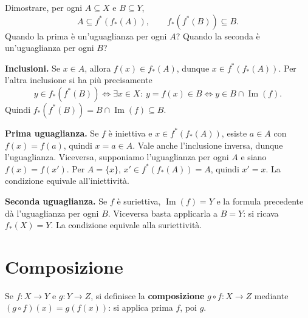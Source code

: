 \begin{schema}
\end{schema}

\begin{esercizio}
Dimostrare, per ogni $A\subseteq X$ e $B\subseteq Y$,
\[
A\subseteq f^*(f_*(A)),\qquad f_*(f^*(B))\subseteq B.
\]
Quando la prima è un'uguaglianza per ogni $A$? Quando la seconda è un'uguaglianza per ogni $B$?
\end{esercizio}
\begin{svolgimento}
\textbf{Inclusioni.} Se $x\in A$, allora $f(x)\in f_*(A)$, dunque $x\in f^*(f_*(A))$. Per l'altra inclusione si ha più precisamente
\[
y\in f_*(f^*(B))\iff \exists x\in X:\ y=f(x)\in B
\iff y\in B\cap\operatorname{Im}(f).
\]
Quindi $f_*(f^*(B))=B\cap\operatorname{Im}(f)\subseteq B$.

\textbf{Prima uguaglianza.} Se $f$ è iniettiva e $x\in f^*(f_*(A))$, esiste $a\in A$ con $f(x)=f(a)$, quindi $x=a\in A$. Vale anche l'inclusione inversa, dunque l'uguaglianza. Viceversa, supponiamo l'uguaglianza per ogni $A$ e siano $f(x)=f(x')$. Per $A=\{x\}$, $x'\in f^*(f_*(A))=A$, quindi $x'=x$. La condizione equivale all'iniettività.

\textbf{Seconda uguaglianza.} Se $f$ è suriettiva, $\operatorname{Im}(f)=Y$ e la formula precedente dà l'uguaglianza per ogni $B$. Viceversa basta applicarla a $B=Y$: si ricava $f_*(X)=Y$. La condizione equivale alla suriettività.
\end{svolgimento}

\section{Composizione}
\begin{definizione}
Se $f:X\to Y$ e $g:Y\to Z$, si definisce la \textbf{composizione} $g\circ f:X\to Z$ mediante $(g\circ f)(x)=g(f(x))$: si applica prima $f$, poi $g$.
\end{definizione}

